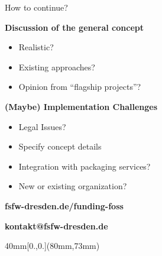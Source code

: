 \documentclass[t]{beamer}
\newcommand{\cst}[1]{{\usebeamercolor[fg]{structure}#1}}
\begin{document}
\begin{frame}[label=zf1]{\cst{How to continue?}}

\textbf{Discussion of the general concept}
\begin{itemize}
 \item Realistic?
 \item Existing approaches?
 \item Opinion from ``flagship projects''?
\end{itemize}


\pause
\vspace{6mm}

\textbf{(Maybe) Implementation Challenges}
\begin{itemize}
 \item Legal Issues?
 \item Specify concept details
 \item Integration with packaging services?
 \item New or existing organization?
\end{itemize}

\bigskip
\pause
{\Large \textbf{fsfw-dresden.de/funding-foss}}
\medskip

{\Large \textbf{kontakt@fsfw-dresden.de}}

\begin{textblock*}{40mm}[0.,0.](80mm,73mm)
\end{textblock*}

\end{frame}

\end{document}
